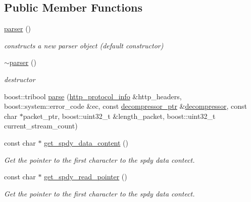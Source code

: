 \subsection*{Public Member Functions}
\begin{DoxyCompactItemize}
\item 
\hyperlink{classpion_1_1spdy_1_1parser_a289c7ef60496f20705af20bec52d5302}{parser} ()
\begin{DoxyCompactList}\small\item\em constructs a new parser object (default constructor) \end{DoxyCompactList}\item 
\hyperlink{classpion_1_1spdy_1_1parser_a4cc2b6ef5639870a53ba9b7a816424fc}{$\sim$parser} ()
\begin{DoxyCompactList}\small\item\em destructor \end{DoxyCompactList}\item 
boost\-::tribool \hyperlink{classpion_1_1spdy_1_1parser_a251c6e62b561e9ce7f8df1712b61f616}{parse} (\hyperlink{namespacepion_1_1spdy_a5263e12cb89d30893e41f7b595cae89a}{http\-\_\-protocol\-\_\-info} \&http\-\_\-headers, boost\-::system\-::error\-\_\-code \&ec, const \hyperlink{namespacepion_1_1spdy_ac8512dffc9267ba133bd2c560f07fd1e}{decompressor\-\_\-ptr} \&\hyperlink{classpion_1_1spdy_1_1decompressor}{decompressor}, const char $\ast$packet\-\_\-ptr, boost\-::uint32\-\_\-t \&length\-\_\-packet, boost\-::uint32\-\_\-t current\-\_\-stream\-\_\-count)
\item 
const char $\ast$ \hyperlink{classpion_1_1spdy_1_1parser_aa3822674ceaa040a6ad36189fbc58744}{get\-\_\-spdy\-\_\-data\-\_\-content} ()
\begin{DoxyCompactList}\small\item\em Get the pointer to the first character to the spdy data contect. \end{DoxyCompactList}\item 
const char $\ast$ \hyperlink{classpion_1_1spdy_1_1parser_a0027e6ba54dd393ba32b1a5f8e80aa1d}{get\-\_\-spdy\-\_\-read\-\_\-pointer} ()
\begin{DoxyCompactList}\small\item\em Get the pointer to the first character to the spdy data contect. \end{DoxyCompactList}\end{DoxyCompactItemize}
